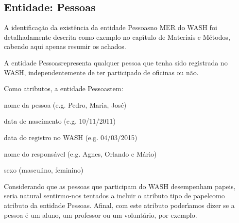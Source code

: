 \documentclass[
12pt,		%
openright,	%
twoside,  %
a4paper,			%
chapter=TITLE,		%
english,			%
french,				%
spanish,			%
brazil				%
]{USPSC-classe/USPSC}
\begin{document}
\subsection[Entidade: Pessoas]{Entidade: Pessoas}\label{Entidade: Pessoas}
A identifica\c{c}\~ao da exist\^encia da entidade \textquotedbl Pessoas\textquotedbl  no MER do WASH foi detalhadamente descrita como exemplo no cap\'{\i}tulo de Materiais e M\'etodos, cabendo aqui apenas resumir os achados.














A entidade \textquotedbl Pessoas\textquotedbl  representa qualquer pessoa que tenha sido registrada no WASH, independentemente de ter participado de oficinas ou n\~ao.














Como atributos, a entidade \textquotedbl Pessoas\textquotedbl  tem:















\begin{alineas}
\item nome da pessoa (e.g. Pedro, Maria, Jos\'e)
\item data de nascimento (e.g. 10/11/2011)
\item data do registro no WASH (e.g. 04/03/2015)
\item nome do respons\'avel (e.g. Agnes, Orlando e M\'ario)
\item sexo (masculino, feminino)
\end{alineas}

Considerando que as pessoas que participam do WASH desempenham \textquotedbl papeis\textquotedbl , seria natural sentirmo-nos tentados a incluir o atributo \textquotedbl tipo de papel\textquotedbl  como atributo da entidade \textquotedbl Pessoas\textquotedbl . Afinal, com este atributo poder\'{\i}amos dizer se a pessoa \'e um aluno, um professor ou um volunt\'ario, por exemplo.
\end{document}
